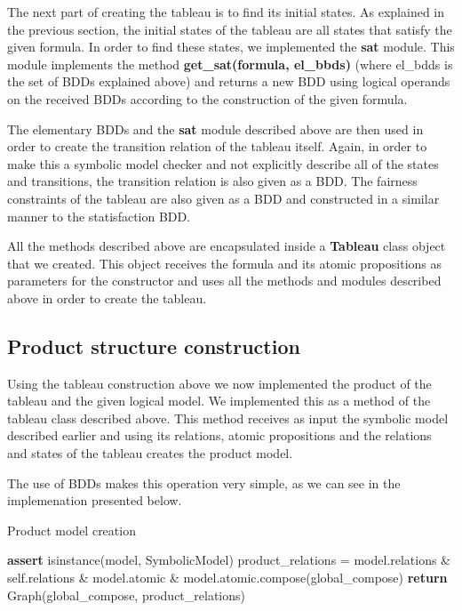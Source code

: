 \documentclass[11pt]{article}
\begin{document}
        The next part of creating the tableau is to find its initial states. As
        explained in the previous section, the initial states of the tableau are
        all states that satisfy the given formula. In order to find these states,
        we implemented the \textbf{sat} module. This module implements the method
        \textbf{get\_sat(formula, el\_bbds)} (where el\_bdds is the set of BDDs
        explained above) and returns a new BDD using logical operands on the
        received BDDs according to the construction of the given formula.

        The elementary BDDs and the \textbf{sat} module described above are then
        used in order to create the transition relation of the tableau itself.
        Again, in order to make this a symbolic model checker and not explicitly
        describe all of the states and transitions, the transition relation is
        also given as a BDD. The fairness constraints of the tableau are also 
        given as a BDD and constructed in a similar manner to the statisfaction
        BDD.

        All the methods described above are encapsulated inside a \textbf{Tableau}
        class object that we created. This object receives the formula and its
        atomic propositions as parameters for the constructor and uses all the
        methods and modules described above in order to create the tableau.

    \subsection{Product structure construction}
        Using the tableau construction above we now implemented the product of
        the tableau and the given logical model. We implemented this as a 
        method of the tableau class described above. This method receives as
        input the symbolic model described earlier and using its relations,
        atomic propositions and the relations and states of the tableau creates
        the product model.

        The use of BDDs makes this operation very simple, as we can see in the
        implemenation presented below.

        \begin{algorithm}[H]
            \caption{Product model creation}\label{product}
                \State \textbf{assert} isinstance(model, SymbolicModel)
                \State product\_relations = model.relations \& self.relations 
                    \quad\quad\& model.atomic \& model.atomic.compose(global\_compose)
                \State \textbf{return} Graph(global\_compose, product\_relations)
            \EndProcedure
        \end{algorithm}
\end{document}
